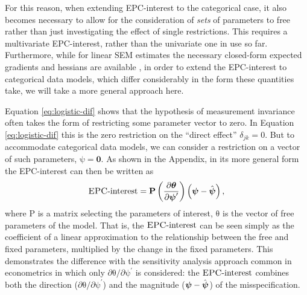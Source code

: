 \documentclass[letterpaper,12pt]{article}
\newcommand\vm[1]{%
\bm{\mathrm{#1}}}
\newcommand{\param}{\vm{\theta}}
\newcommand{\bpsi}{\vm{\psi}}
\newcommand{\da}{\textrm{{\sc {EPC}}-interest}}
\begin{document}
For this reason, when extending EPC-interest to the categorical case, it also becomes necessary to allow for the consideration of \emph{sets} of parameters to free rather than just investigating the effect of single restrictions. This requires a multivariate EPC-interest, rather than the univariate one in use so far. Furthermore, while for linear SEM estimates the necessary closed-form expected gradients and hessians are available \citep{Oberski:WP:EPC-interest}, in order to extend the EPC-interest to categorical data models, which differ considerably in the form these quantities take, we will take a more general approach here.

Equation \ref{eq:logistic-dif} shows that the hypothesis of measurement invariance often takes the form of restricting some parameter vector to zero. In Equation \ref{eq:logistic-dif} this is the zero restriction on the ``direct effect'' $\delta_{jk}=0$. But to accommodate categorical data models, we can consider a restriction on a vector of such parameters, $\bpsi=\mathbf{0}$.
As shown in the Appendix, in its more general form the EPC-interest can then be written as 
\begin{equation}
	\da = \vm{P} \left( \frac{\partial \param} {\partial \bpsi^\prime} \right) \left( \bpsi - \hat{\bpsi}\right),
	\label{eq:epc-linear}
\end{equation}
where $\vm{P}$ is a matrix selecting the parameters of interest, $\param$ is the vector of free parameters of the model.
That is, the $\da{}$ can be seen simply as the coefficient of a linear approximation to the relationship between the free and fixed parameters, multiplied by the change in the fixed parameters. This demonstrates the difference with the sensitivity analysis approach common in econometrics \citep[p. 168]{magnus2007local} in which only $\partial \param / \partial \bpsi^\prime$ is considered: the $\da{}$ combines both the direction ($\partial \param / \partial \bpsi^\prime$) and the magnitude ($ \bpsi - \hat{\bpsi}$) of the misspecification.

\end{document}
